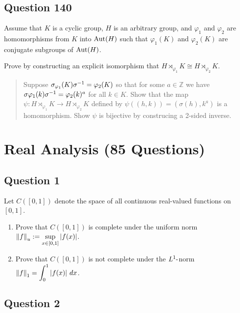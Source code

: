 \documentclass[12pt]{article}
\providecommand{\tightlist}{%
  \setlength{\itemsep}{0pt}\setlength{\parskip}{0pt}}
\begin{document}
\hypertarget{question-140}{%
\subsection{Question 140}\label{question-140}}

Assume that \(K\) is a cyclic group, \(H\) is an arbitrary group, and
\(\varphi_1\) and \(\varphi_2\) are homomorphisms from \(K\) into
\({\text{Aut}}(H)\) such that \(\varphi_1(K)\) and \(\varphi_2(K)\) are
conjugate subgroups of \({\text{Aut}}(H)\).

Prove by constructing an explicit isomorphism that
\(H\rtimes_{\varphi_1}K\cong H\rtimes_{\varphi_2} K\).

\begin{quote}
Suppose \(\sigma_{\varphi_1}(K)\sigma^{-1}=\varphi_2(K)\) so that for
some \(a\in\mathbb Z\) we have
\(\sigma\varphi_1(k)\sigma^{-1} =\varphi_2(k)^a\) for all \(k\in K\).
Show that the map
\(\psi:H \rtimes_{\varphi_1}K\rightarrow H\rtimes_{\varphi_2}K\) defined
by \(\psi((h,k))=(\sigma(h),k^a)\) is a homomorphism. Show \(\psi\) is
bijective by construcing a 2-sided inverse.
\end{quote}

\hypertarget{real-analysis-85-questions}{%
\section{Real Analysis (85
Questions)}\label{real-analysis-85-questions}}

\hypertarget{question-1-1}{%
\subsection{Question 1}\label{question-1-1}}

Let \(C([0, 1])\) denote the space of all continuous real-valued
functions on \([0, 1]\).

\begin{enumerate}
\def\labelenumi{\alph{enumi}.}
\tightlist
\item
  Prove that \(C([0, 1])\) is complete under the uniform norm
  \({\left\lVert {f} \right\rVert}_u := \displaystyle\sup_{x\in [0,1]} |f (x)|\).
\item
  Prove that \(C([0, 1])\) is not complete under the \(L^1{\hbox{-}}\)norm
  \({\left\lVert {f} \right\rVert}_1 = \displaystyle\int_0^1 |f (x)| ~dx\).
\end{enumerate}

\hypertarget{question-2-1}{%
\subsection{Question 2}\label{question-2-1}}
\end{document}
